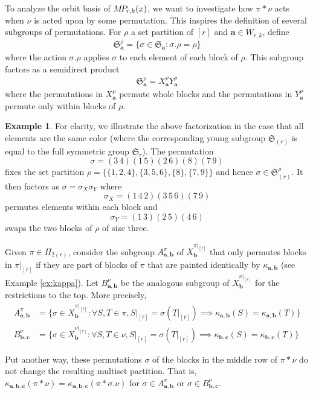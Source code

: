 \documentclass[10pt]{amsart}
\theoremstyle{definition}
\theoremstyle{definition}
\newtheorem{exam}[exam]{Example}
\theoremstyle{plain}
\theoremstyle{remark}
\theoremstyle{plain}
\theoremstyle{plain}
\newcommand{\SG}{\mathfrak{S}}
\newcommand{\bfa}{{\boldsymbol{a}}}
\newcommand{\bfb}{{\boldsymbol{b}}}
\newcommand{\bfc}{{\boldsymbol{c}}}
\newcommand{\MP}{{\rm M\!P\!}}
\newcommand{\ov}[1]{\bar{#1}}
\newcommand{\ovb}[1]{\left[\ov{#1}\right]}
\begin{document}
To analyze the orbit basis of $\MP_{r,k}(x)$, we want to investigate how $\pi\ast\nu$ acts when $\nu$ is acted upon by some permutation. This inspires the definition of several subgroups of permutations. For $\rho$ a set partition of $[r]$ and $\bfa\in W_{r,k}$, define \begin{align*}
    \SG_\bfa^\rho=\{\sigma\in\SG_\bfa:\sigma.\rho=\rho\}
\end{align*} where the action $\sigma.\rho$ applies $\sigma$ to each element of each block of $\rho$. This subgroup factors as a semidirect product \begin{align*}
    \SG_\bfa^\rho=X_\bfa^\rho Y_\bfa^\rho
\end{align*} where the permutations in $X_\bfa^\rho$ permute whole blocks and the permutations in $Y_\bfa^\rho$ permute only within blocks of $\rho$.

\begin{exam} For clarity, we illustrate the above factorization in the case that all elements are the same color (where the corresponding young subgroup $\SG_{(r)}$ is equal to the full symmetric group $\SG_r$). The permutation \[\sigma=(3\,4)(1\,5)(2\,6)(8)(7\,9)\] fixes the set partition $\rho=\{\{1,2,4\},\{3,5,6\},\{8\},\{7,9\}\}$ and hence $\sigma\in \SG_{(r)}^\rho$. It then factors as $\sigma=\sigma_X\sigma_Y$ where \[\sigma_X=(1\,4\,2)(3\,5\,6)(7\,9)\] permutes elements within each block and \[\sigma_Y=(1\,3)(2\,5)(4\,6)\] swaps the two blocks of $\rho$ of size three. 
\end{exam}

Given $\pi\in\Pi_{2(r)}$, consider the subgroup $A_{\bfa,\bfb}^\pi$ of $X_\bfb^{\pi|_{\ovb{r}}}$ that only permutes blocks in $\pi|_{\ovb{r}}$ if they are part of blocks of $\pi$ that are painted identically by $\kappa_{\bfa,\bfb}$ (see Example \ref{ex:kappa}). Let $B_{\bfa,\bfb}^\nu$ be the analogous subgroup of $X_\bfb^{\nu|_{\ovb{r}}}$ for the restrictions to the top. More precisely,
\begin{align*}
    A^\pi_{\bfa,\bfb}&=\{\sigma\in X_\bfb^{\pi|_{\ovb{r}}}:\forall S,T\in\pi, S|_{\ovb{r}}=\sigma(T|_{\ovb{r}})\implies \kappa_{\bfa,\bfb}(S)=\kappa_{\bfa,\bfb}(T)\}\\
    B^\nu_{\bfb,\bfc}&=\{\sigma\in X_\bfb^{\nu|_{[r]}}:\forall S,T\in\nu, S|_{[r]}=\sigma(T|_{[r]})\implies \kappa_{\bfb,\bfc}(S)=\kappa_{\bfb,\bfc}(T)\}
\end{align*}

Put another way, these permutations $\sigma$ of the blocks in the middle row of $\pi\ast\nu$ do not change the resulting multiset partition. That is, $\kappa_{\bfa,\bfb,\bfc}(\pi\ast\nu)=\kappa_{\bfa,\bfb,\bfc}(\pi\ast\sigma.\nu)$ for $\sigma\in A_{\bfa,\bfb}^\pi$ or $\sigma\in B_{\bfb,\bfc}^\nu$.
\end{document}
